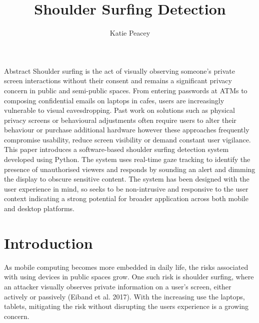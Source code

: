 \documentclass[12pt]{article}
\title{ Shoulder Surfing Detection}
\author{Katie Peacey}
\theoremstyle{plain}
\theoremstyle{definition}
\begin{document}

\maketitle
\studentdeclarations

\begin{frontmatterparagraph}{Abstract}
Shoulder surfing is the act of visually observing someone’s private screen interactions without their consent and remains a significant privacy concern in public and semi-public spaces. From entering passwords at ATMs to composing confidential emails on laptops in cafes, users are increasingly vulnerable to visual eavesdropping. Past work on solutions such as physical privacy screens or behavioural adjustments often require users to alter their behaviour or purchase additional hardware however these approaches frequently compromise usability, reduce screen visibility or demand constant user vigilance. This paper introduces a software-based shoulder surfing detection system developed using Python. The system uses real-time gaze tracking to identify the presence of unauthorised viewers and responds by sounding an alert and dimming the display to obscure sensitive content. The system has been designed  with the user experience in mind, so seeks to be non-intrusive and responsive to the user context indicating a strong potential for broader application across both mobile and desktop platforms.
\end{frontmatterparagraph}

\tableofcontents

\listoffigures
\listoftables
\clearpage


\section{Introduction}
\label{sec:intro}

As mobile computing becomes more embedded in daily life, the risks associated with using devices in public spaces grow. One such risk is shoulder surfing, where an attacker visually observes private information on a user’s screen, either actively or passively (Eiband et al. 2017). With the increasing use the laptops, tablets, mitigating the risk without disrupting the users experience is  a growing concern. 
\end{document}
